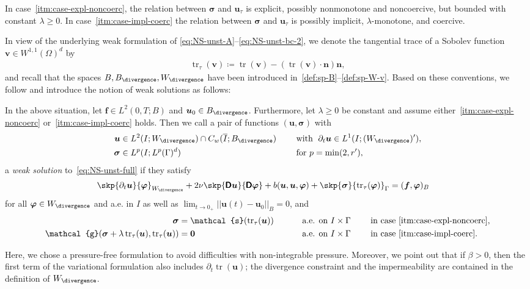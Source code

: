 \documentclass[reqno,a4paper]{amsart}
\def\norm#1{\left|\!\left| #1 \right|\!\right|}
\def\tens#1{\pmb{\mathsf{#1}}}
\def\vec#1{\boldsymbol{#1}}
\def\tr{\mathop{\mathrm{tr}}\nolimits}
\def\Bdiv{{B_{\divergence}}}
\def\Wdiv{{W_{\divergence}}}
\def\b0{\vec{0}}
\def\bf{\vec{f}}
\def\bn{\vec{n}}
\def\bu{\vec{u}}
\def\bv{\vec{v}}
\def\bphi{\vec{\varphi}}
\def\bsigma{\vec{\sigma}}
\def\BD{\tens{D}}
\def\gbd{\vec{\mathcal{g}}}
\def\Srel{\vec{\mathcal{s}}}
\begin{document}
In case~\ref{itm:case-expl-noncoerc},  the relation between $\bsigma$ and $\bu_\tau$ is explicit, 
possibly nonmonotone and noncoercive, 
but bounded with constant $\lambda \geq 0$. 
In case~\ref{itm:case-impl-coerc} the relation between $\bsigma$ and $\bu_\tau$ is possibly implicit, $\lambda$-monotone, and coercive. 

In view of the underlying weak formulation of \eqref{eq:NS-unst-A}--\eqref{eq:NS-unst-bc-2}, we denote the tangential trace of a Sobolev function $\bv\in W^{1,1}(\Omega)^{d}$ by
\begin{align}\label{def:tr-tau}
	\tr_{\tau}	(\bv) \coloneqq \tr(\bv) - (\tr(\bv) \cdot \bn) \bn, 
\end{align}
and recall that the spaces 
$B, \Bdiv, \Wdiv$ have been introduced in~\eqref{def:sp-B}--\eqref{def:sp-W-v}. Based on these conventions, we follow \cite{Abbatiello2021,BulicekMalekMaringova2023} and introduce the notion of weak solutions as follows: 
\begin{definition}\label{def:unst-w-sol}
	In the above situation, let $\bf \in L^2(0,T;B)$ and $\bu_0 \in \Bdiv$. 
	Furthermore, let $\lambda \geq 0$ be constant and assume either~\ref{itm:case-expl-noncoerc} or~\ref{itm:case-impl-coerc} holds. 
	Then we call a  pair of functions $(\bu, \bsigma)$ with
	\begin{alignat*}{3}
		\bu	&\in L^2(I;\Wdiv) \cap C_w(\overline I;\Bdiv)\quad &&\text{ with } \;
		\partial_t \bu \in L^{1}(I;(\Wdiv)'), 
		\\
		\bsigma &\in L^{p}(I;L^{p}(\Gamma)^d) \qquad &&\text{ for } p = \min (2,r'),
	\end{alignat*} 
	a \emph{weak solution} to~\eqref{eq:NS-unst-full}  if they satisfy
	\begin{alignat*}{3}%
		\skp{\partial_t \bu}{{\bphi}}_{\Wdiv} 
		+2\nu  \skp{ \BD \bu}{ \BD \bphi }	+ b(\bu, \bu, \bphi) 
		+\skp{ \bsigma}{ \tr_{\tau}(\bphi) }_{\Gamma}  
		&= ({\bf}, {\bphi})_B
	\end{alignat*}
	for all  $\bphi \in \Wdiv$ and a.e. in $I$ as well as  $\lim_{t \to 0_+}	\norm{{\bu}(t) - {\bu}_0}_B = 0$, 
	and 
	\begin{alignat*}{3}%
		\bsigma &= \Srel(\tr_{\tau} (\bu))  \qquad &&\text{ a.e. on } I\times \Gamma \qquad \text{ in case \ref{itm:case-expl-noncoerc},}\\
		\gbd(\bsigma + \lambda \tr_{\tau} (\bu), \tr_{\tau}(\bu))&=\b0 \qquad &&\text{ a.e. on } I\times \Gamma \qquad \text{ in case \ref{itm:case-impl-coerc}.}
	\end{alignat*}
\end{definition}
Here, we chose a pressure-free formulation to avoid difficulties with non-integrable pressure. Moreover, we point out that if $\beta >0$, then the first term of the variational formulation also includes $\partial_t  \tr(\bu)$; the divergence constraint and the impermeability are contained in the definition of $\Wdiv$. 
\medskip 
\end{document}
